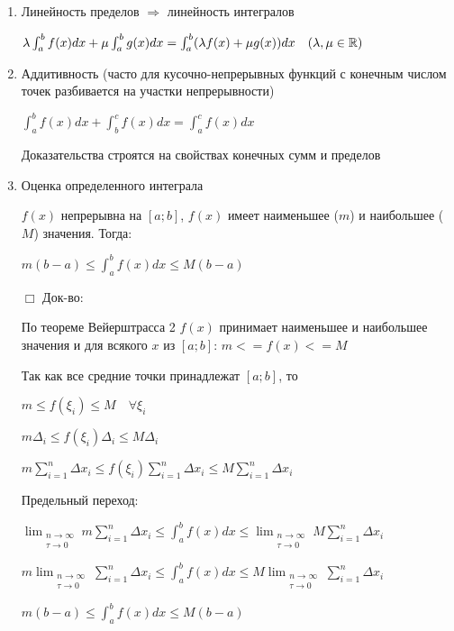 \documentclass[12pt]{article}
\begin{document}
    \begin{enumerate}
        \item Линейность пределов $\Longrightarrow$ линейность интегралов

        $\lambda \int^b_a f(x)dx + \mu \int^b_a g(x)dx = \int^b_a (\lambda f(x) + \mu g(x)) dx \quad (\lambda, \mu \in \mathbb{R})$

        \item Аддитивность (часто для кусочно-непрерывных функций с конечным числом точек разбивается на участки непрерывности)

        $\int^b_a f(x)dx + \int^c_b f(x)dx = \int^c_a f(x)dx$

        Доказательства строятся на свойствах конечных сумм и пределов

        \item \hypertarget{integralevaluation}{Оценка определенного интеграла}

        $f(x)$ непрерывна на $[a; b]$, $f(x)$ имеет наименьшее ($m$) и наибольшее ($M$) значения. Тогда:

        $m (b-a) \leq \int^b_a f(x)dx \leq M(b - a)$

        $\Box$ Док-во:

        По теореме Вейерштрасса 2 $f(x)$ принимает наименьшее и наибольшее значения и для всякого $x$ из $[a; b]$:  $m <= f(x) <= M$

        Так как все средние точки принадлежат $[a; b]$, то

        $m \leq f(\xi_i) \leq M \quad \forall \xi_i$

        $m \Delta_i \leq f(\xi_i) \Delta_i \leq M \Delta_i$

        $m \sum_{i=1}^n \Delta x_i \leq f(\xi_i) \sum_{i=1}^n \Delta x_i \leq M \sum_{i=1}^n \Delta x_i$

        Предельный переход:

        $\lim_{\substack{n\to\infty \\ \tau\to0}} m \sum_{i=1}^n \Delta x_i \leq \int^b_a f(x) dx \leq \lim_{\substack{n\to\infty \\ \tau\to0}} M \sum_{i=1}^n \Delta x_i$

        $m \lim_{\substack{n\to\infty \\ \tau\to0}} \sum_{i=1}^n \Delta x_i \leq \int^b_a f(x) dx \leq M \lim_{\substack{n\to\infty \\ \tau\to0}} \sum_{i=1}^n \Delta x_i$

        $m (b - a) \leq \int^b_a f(x) dx \leq M (b - a)$


\end{enumerate}
\end{document}
